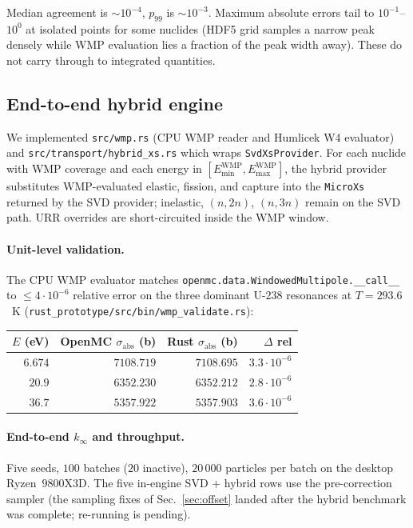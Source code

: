 \documentclass[11pt,a4paper]{article}
\begin{document}
Median agreement is $\sim\!10^{-4}$, $p_{99}$ is
$\sim\!10^{-3}$. Maximum absolute errors tail to
$10^{-1}$--$10^{0}$ at isolated points for some nuclides
(HDF5 grid samples a narrow peak densely while WMP
evaluation lies a fraction of the peak width away). These do
not carry through to integrated quantities.

\subsection{End-to-end hybrid engine}
\label{sec:hybrid_e2e}

We implemented \texttt{src/wmp.rs} (CPU WMP reader and
Humlicek W4 evaluator) and \texttt{src/transport/hybrid\_xs.rs}
which wraps \texttt{SvdXsProvider}. For each nuclide with WMP
coverage and each energy in
$[E_\text{min}^\text{WMP}, E_\text{max}^\text{WMP}]$, the
hybrid provider substitutes WMP-evaluated elastic, fission,
and capture into the \texttt{MicroXs} returned by the SVD
provider; inelastic, $(n,2n)$, $(n,3n)$ remain on the SVD
path. URR overrides are short-circuited inside the WMP window.

\paragraph{Unit-level validation.}
The CPU WMP evaluator matches
\texttt{openmc.data.\-WindowedMultipole.\_\_call\_\_} to
$\leq 4\cdot 10^{-6}$ relative error on the three dominant
U-$238$ resonances at $T = 293.6$~K
(\texttt{rust\_prototype/src/bin/wmp\_validate.rs}):

\begin{center}
\begin{tabular}{@{}rrrr@{}}
\toprule
$E$ (eV) & OpenMC $\sigma_\text{abs}$ (b) & Rust $\sigma_\text{abs}$ (b) & $\Delta$ rel \\
\midrule
$6.674$  & $7108.719$ & $7108.695$ & $3.3 \cdot 10^{-6}$ \\
$20.9$   & $6352.230$ & $6352.212$ & $2.8 \cdot 10^{-6}$ \\
$36.7$   & $5357.922$ & $5357.903$ & $3.6 \cdot 10^{-6}$ \\
\bottomrule
\end{tabular}
\end{center}

\paragraph{End-to-end $k_\infty$ and throughput.}
Five seeds, $100$ batches ($20$ inactive), $20\,000$
particles per batch on the desktop Ryzen~$9800$X3D. The five
in-engine SVD + hybrid rows use the pre-correction sampler
(the sampling fixes of Sec.~\ref{sec:offset} landed after the
hybrid benchmark was complete; re-running is pending).
\end{document}
